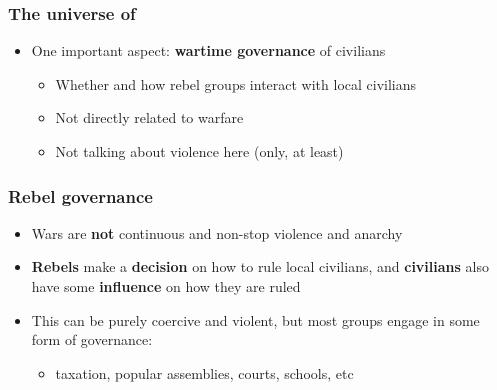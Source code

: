 \documentclass[aspectratio=43]{beamer}
\begin{document}
\begin{frame}
\frametitle{The universe of }
\centering

\begin{itemize}
  \item One important aspect: \textbf{wartime governance} of civilians
  \begin{itemize}
    \item<2-> Whether and how rebel groups interact with local civilians
    \item<3-> Not directly related to warfare
    \item<4-> Not talking about violence here (only, at least)
  \end{itemize}
\end{itemize}

\end{frame}



\begin{frame}
\frametitle{Rebel governance}
\centering

\begin{itemize}
  \item<1-> Wars are \textbf{not} continuous and non-stop violence and anarchy
  \item<2-> \textbf{Rebels} make a \textbf{decision} on how to rule local civilians, and \textbf{civilians} also have some \textbf{influence} on how they are ruled
  \item<3-> This  can be purely coercive and violent, but most groups engage in some form of governance:
  \begin{itemize}
    \item taxation, popular assemblies, courts, schools, etc
  \end{itemize}
\end{itemize}

\end{frame}
\end{document}
